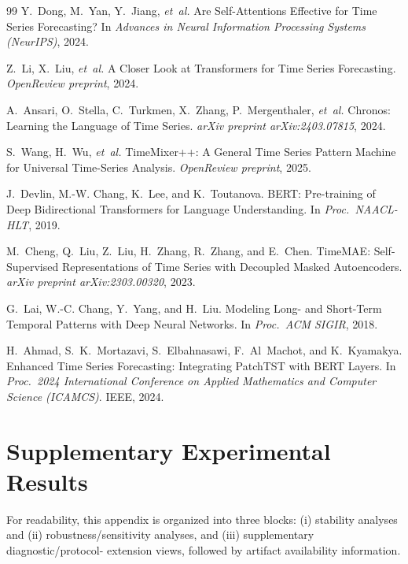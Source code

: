 \documentclass{ieeeaccess}
\begin{document}
\begin{thebibliography}{99}
Y.~Dong, M.~Yan, Y.~Jiang, \emph{et~al.}
\newblock Are Self-Attentions Effective for Time Series Forecasting?
\newblock In \emph{Advances in Neural Information Processing Systems (NeurIPS)}, 2024.

Z.~Li, X.~Liu, \emph{et~al.}
\newblock A Closer Look at Transformers for Time Series Forecasting.
\newblock \emph{OpenReview preprint}, 2024.

A.~Ansari, O.~Stella, C.~Turkmen, X.~Zhang, P.~Mergenthaler, \emph{et~al.}
\newblock Chronos: Learning the Language of Time Series.
\newblock \emph{arXiv preprint arXiv:2403.07815}, 2024.

S.~Wang, H.~Wu, \emph{et~al.}
\newblock TimeMixer++: A General Time Series Pattern Machine for Universal
Time-Series Analysis.
\newblock \emph{OpenReview preprint}, 2025.

J.~Devlin, M.-W. Chang, K.~Lee, and K.~Toutanova.
\newblock BERT: Pre-training of Deep Bidirectional Transformers for Language
Understanding.
\newblock In \emph{Proc.\ NAACL-HLT}, 2019.

M.~Cheng, Q.~Liu, Z.~Liu, H.~Zhang, R.~Zhang, and E.~Chen.
\newblock TimeMAE: Self-Supervised Representations of Time Series with Decoupled
Masked Autoencoders.
\newblock \emph{arXiv preprint arXiv:2303.00320}, 2023.

G.~Lai, W.-C. Chang, Y.~Yang, and H.~Liu.
\newblock Modeling Long- and Short-Term Temporal Patterns with Deep Neural Networks.
\newblock In \emph{Proc.\ ACM SIGIR}, 2018.

H.~Ahmad, S.~K.~Mortazavi, S.~Elbahnasawi, F.~Al~Machot, and K.~Kyamakya.
\newblock Enhanced Time Series Forecasting: Integrating PatchTST with BERT Layers.
\newblock In \emph{Proc.\ 2024 International Conference on Applied Mathematics and
Computer Science (ICAMCS)}. IEEE, 2024.

\end{thebibliography}

\appendices
\section{Supplementary Experimental Results}\label{app:full_results}

For readability, this appendix is organized into three blocks: (i) stability analyses and
(ii) robustness/sensitivity analyses, and (iii) supplementary diagnostic/protocol-
extension views, followed by artifact availability information.
\end{document}

